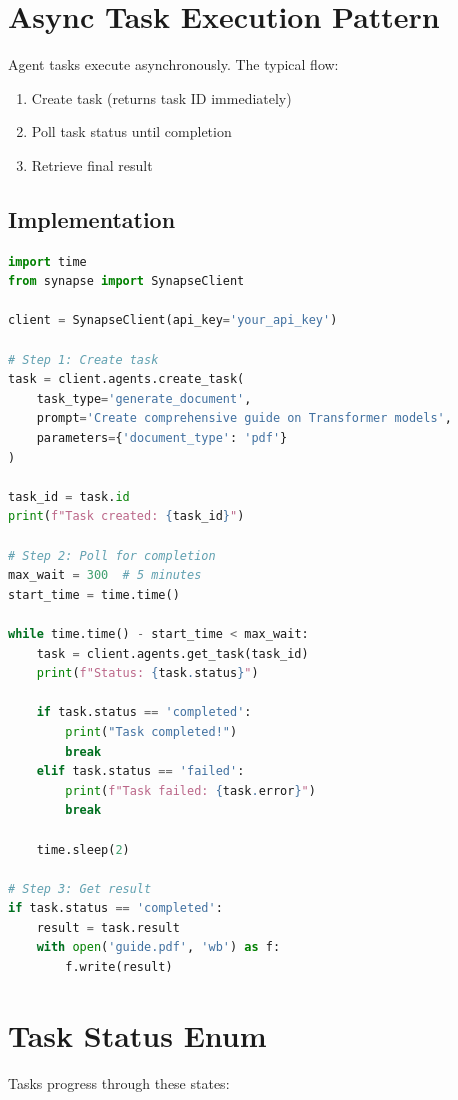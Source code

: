 \documentclass{report}
\begin{document}
\section{Async Task Execution Pattern}

Agent tasks execute asynchronously. The typical flow:

\begin{enumerate}
    \item Create task (returns task ID immediately)
    \item Poll task status until completion
    \item Retrieve final result
\end{enumerate}

\subsection{Implementation}

\begin{lstlisting}[language=Python]
import time
from synapse import SynapseClient

client = SynapseClient(api_key='your_api_key')

# Step 1: Create task
task = client.agents.create_task(
    task_type='generate_document',
    prompt='Create comprehensive guide on Transformer models',
    parameters={'document_type': 'pdf'}
)

task_id = task.id
print(f"Task created: {task_id}")

# Step 2: Poll for completion
max_wait = 300  # 5 minutes
start_time = time.time()

while time.time() - start_time < max_wait:
    task = client.agents.get_task(task_id)
    print(f"Status: {task.status}")
    
    if task.status == 'completed':
        print("Task completed!")
        break
    elif task.status == 'failed':
        print(f"Task failed: {task.error}")
        break
    
    time.sleep(2)

# Step 3: Get result
if task.status == 'completed':
    result = task.result
    with open('guide.pdf', 'wb') as f:
        f.write(result)
\end{lstlisting}

\section{Task Status Enum}

Tasks progress through these states:
\end{document}
